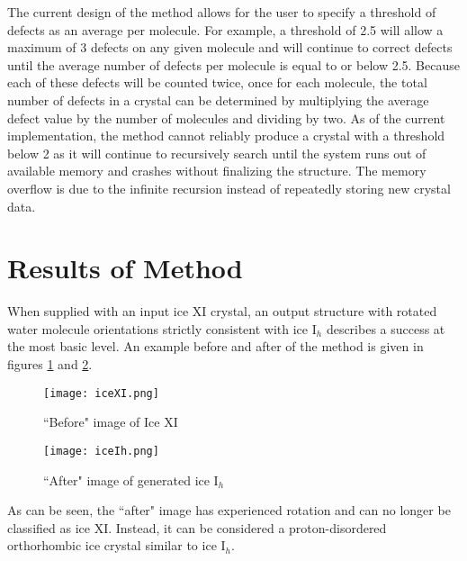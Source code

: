 The current design of the method allows for the user to specify a threshold of defects as an average per molecule. 
For example, a threshold of 2.5 will allow a maximum of 3 defects on any given molecule and will continue to correct defects until the average number of defects per molecule is equal to or below 2.5.
Because each of these defects will be counted twice, once for each molecule, the total number of defects in a crystal can be determined by multiplying the average defect value by the number of molecules and dividing by two.
As of the current implementation, the method cannot reliably produce a crystal with a threshold below 2 as it will continue to recursively search until the system runs out of available memory and crashes without finalizing the structure.
The memory overflow is due to the infinite recursion instead of repeatedly storing new crystal data.

\section{Results of Method}

When supplied with an input ice XI crystal, an output structure with rotated water molecule orientations strictly consistent with ice I$_{h}$ describes a success at the most basic level.
An example before and after of the method is given in figures \ref{fig:iceXI} and \ref{fig:iceIh}.
\begin{figure}
	
	\centering
	
	\texttt{[image: iceXI.png]}
	
	\caption{``Before" image of Ice XI}
	
	\label{fig:iceXI}
	
\end{figure}
\begin{figure}
	
	\centering
	
	\texttt{[image: iceIh.png]}
	
	\caption{``After" image of generated ice I$_{h}$}
	
	\label{fig:iceIh}
	
\end{figure}
As can be seen, the ``after" image has experienced rotation and can no longer be classified as ice XI. 
Instead, it can be considered a proton-disordered orthorhombic ice crystal similar to ice I$_{h}$. 

